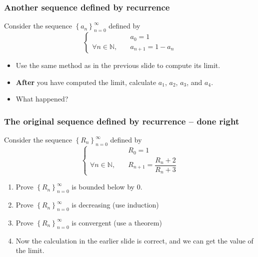 \documentclass[14pt]{beamer}
\begin{document}
\begin{frame}[t]
	\frametitle{Another sequence defined by recurrence}
	Consider the sequence $\displaystyle \left\{ a_{n} \right\}_{n=0}^{\infty}$ defined
	by
	\begin{equation*}
		\begin{cases}
			                                & a_{0}= 1           \\
			\forall n \in \mathbb{N}, \quad & a_{n+1}= 1 - a_{n}
		\end{cases}
	\end{equation*}

	\begin{itemize}
		\item Use the same method as in the previous slide to compute its limit.

		\item {\bfseries After} you have computed the limit, calculate $a_{1}$, $a_{2}$,
			$a_{3}$, and $a_{4}$.

		\item What happened?
	\end{itemize}
\end{frame}

\begin{frame}[t]
	\frametitle{The original sequence defined by recurrence -- done right}

	Consider the sequence $\displaystyle \left\{ R_{n} \right\}_{n=0}^{\infty}$
	defined by
	\begin{equation*}
		\begin{cases}
			                                & R_{0}= 1                           \\
			\forall n \in \mathbb{N}, \quad & R_{n+1}= \dfrac{ R_n + 2}{R_n + 3}
		\end{cases}
	\end{equation*}

	\begin{enumerate}
		\item Prove $\displaystyle \left\{ R_{n} \right\}_{n=0}^{\infty}$ is bounded
			below by 0.

		\item Prove $\displaystyle \left\{ R_{n} \right\}_{n=0}^{\infty}$ is decreasing
			(use induction)

		\item Prove $\displaystyle \left\{ R_{n} \right\}_{n=0}^{\infty}$ is convergent
			(use a theorem)

		\item Now the calculation in the earlier slide is correct, and we can get
			the value of the limit.
	\end{enumerate}
\end{frame}
\end{document}
